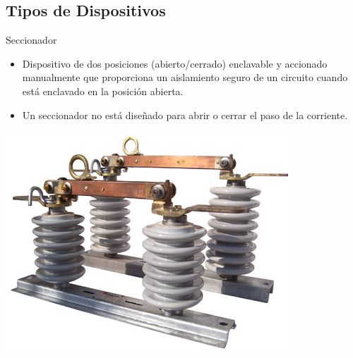 \documentclass[xcolor={usenames,svgnames,dvipsnames}]{beamer}
\begin{document}
\subsection{Tipos de Dispositivos}
\label{sec:org73edabf}

\begin{frame}[label={sec:org7ca43ed}]{Seccionador}
\begin{itemize}
\item Dispositivo de dos posiciones (abierto/cerrado) enclavable y accionado manualmente que proporciona un aislamiento seguro de un circuito cuando está enclavado en la posición abierta.

\item Un seccionador no está diseñado para abrir o cerrar el paso de la corriente.
\end{itemize}

\begin{center}
\includegraphics[height=0.6\textheight]{../figs/seccionador.jpeg}
\end{center}
\end{frame}
\end{document}
